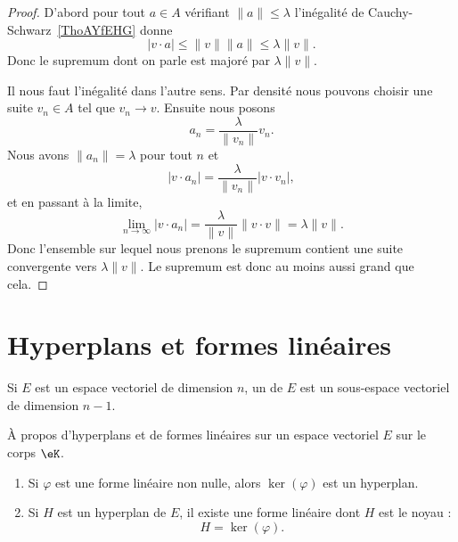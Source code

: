 \begin{proof}
    D'abord pour tout \( a\in A\) vérifiant \( \| a \|\leq \lambda\) l'inégalité de Cauchy-Schwarz~\ref{ThoAYfEHG} donne
    \begin{equation}
        | v\cdot a |\leq \| v \|\| a \|\leq \lambda\| v \|.
    \end{equation}
    Donc le supremum dont on parle est majoré par \( \lambda\| v \|\).

    Il nous faut l'inégalité dans l'autre sens. Par densité nous pouvons choisir une suite \( v_n\in A\) tel que \( v_n\to v\). Ensuite nous posons
    \begin{equation}
        a_n=\frac{ \lambda }{ \| v_n \| }v_n.
    \end{equation}
    Nous avons \( \| a_n \|=\lambda\) pour tout \( n\) et
    \begin{equation}
        | v\cdot a_n |=\frac{ \lambda }{ \| v_n \| }| v\cdot v_n |,
    \end{equation}
    et en passant à la limite,
    \begin{equation}
        \lim_{n\to \infty} | v\cdot a_n |=\frac{ \lambda }{ \| v \| }\| v\cdot v \|=\lambda\| v \|.
    \end{equation}
    Donc l'ensemble sur lequel nous prenons le supremum contient une suite convergente vers \( \lambda\| v \|\). Le supremum est donc au moins aussi grand que cela.
\end{proof}

\section{Hyperplans et formes linéaires}

\begin{definition}      \label{DEFooEWDTooQbUQws}
    Si \( E\) est un espace vectoriel de dimension \( n\), un  de \( E\) est un sous-espace vectoriel de dimension \( n-1\).
\end{definition}

\begin{proposition}      \label{PROPooVYJUooAWDQrZ}
    À propos d'hyperplans et de formes linéaires sur un espace vectoriel \( E\) sur le corps \( \eK\).
    \begin{enumerate}
        \item
            Si \( \varphi\) est une forme linéaire non nulle, alors \( \ker(\varphi)\) est un hyperplan.
        \item
            Si \( H\) est un hyperplan de \( E\), il existe une forme linéaire dont \( H\) est le noyau :
            \begin{equation}
                H=\ker(\varphi).
            \end{equation}
    \end{enumerate}
\end{proposition}

